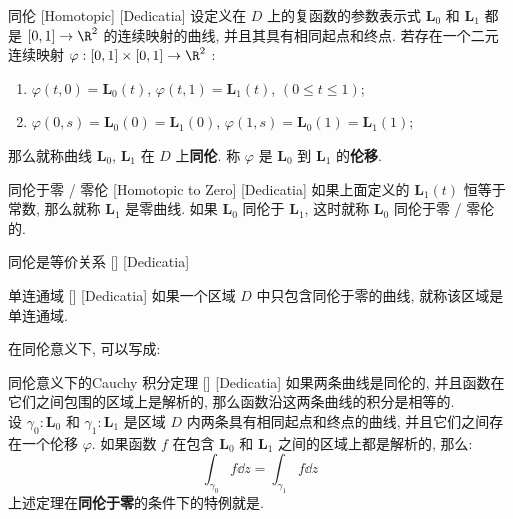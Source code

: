 \documentclass[UTF8]{ctexart}
\begin{document}
        \begin{dfn}
            [UUID]
            {同伦}
            [Homotopic]
            [Dedicatia]
            设定义在 \(D\) 上的复函数的参数表示式 \(\bm{L}_0\) 和 \(\bm{L}_1\) 都是 \([0,1]\to\R^2\) 的连续映射的曲线, 并且其具有相同起点和终点. 若存在一个二元连续映射 \(\varphi:[0,1]\times[0,1]\to\R^2\) :
            \begin{enumerate}
                \item  \(\varphi(t,0)=\bm{L}_0(t)\),  \(\varphi(t,1)=\bm{L}_1(t)\),  \((0\leq t\leq 1)\);
                \item  \(\varphi(0,s)=\bm{L}_0(0)=\bm{L}_1(0)\),  \(\varphi(1,s)=\bm{L}_0(1)=\bm{L}_1(1)\);
            \end{enumerate}
            那么就称曲线 \(\bm{L}_0\),  \(\bm{L}_1\) 在 \(D\) 上\textbf{同伦}. 称 \(\varphi\) 是 \(\bm{L}_0\) 到 \(\bm{L}_1\) 的\textbf{伦移}. 
        \end{dfn}

        \begin{dfn}
            [UUID]
            {同伦于零 / 零伦}
            [Homotopic to Zero]
            [Dedicatia]
            如果上面定义的 \(\bm{L}_1(t)\) 恒等于常数, 那么就称 \(\bm{L}_1\) 是零曲线. 如果 \(\bm{L}_0\) 同伦于 \(\bm{L}_1\), 这时就称 \(\bm{L}_0\) 同伦于零 / 零伦的. 
        \end{dfn}

        \begin{ppt}
            [UUID]
            {同伦是等价关系}
            []
            [Dedicatia]
        \end{ppt}
        
        \begin{dfn}
            [UUID]
            {单连通域}
            []
            [Dedicatia]
            如果一个区域 \(D\) 中只包含同伦于零的曲线, 就称该区域是单连通域. 
        \end{dfn}

        在同伦意义下, \CauchyThm 可以写成: 

        \begin{thm}
            [UUID]
            {同伦意义下的Cauchy 积分定理}
            []
            [Dedicatia]
            如果两条曲线是同伦的, 并且函数在它们之间包围的区域上是解析的, 那么函数沿这两条曲线的积分是相等的. \\
            设  \(\gamma_0:\bm{L}_0\)  和  \(\gamma_1:\bm{L}_1\)  是区域  \(D\)  内两条具有相同起点和终点的曲线, 并且它们之间存在一个伦移  \(\varphi\). 如果函数 \(f\) 在包含 \(\bm{L}_0\) 和 \(\bm{L}_1\) 之间的区域上都是解析的, 那么: 
            \[\int_{\gamma_0}f\dd{z}=\int_{\gamma_1}f\dd{z}\]
            上述定理在\textbf{同伦于零}的条件下的特例就是\CauchyThm.
        \end{thm}
\end{document}
